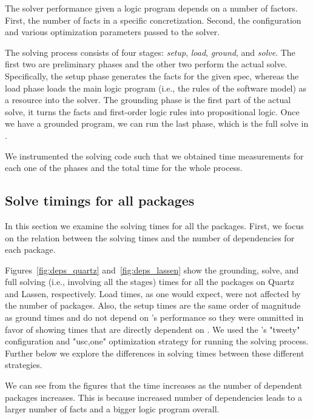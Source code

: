 
The \clingo{} solver performance given a logic program depends
on a number of factors. First, the number of facts in a specific concretization. Second,
the configuration and various optimization parameters passed to the solver. 

The solving process consists of four stages: \emph{setup}, \emph{load}, 
\emph{ground}, and \emph{solve}. The first two are preliminary phases and the other two 
perform the actual solve. Specifically, the setup phase generates the facts for the given
spec, whereas the load phase loads the main logic program (i.e., the rules of the software 
model) as a resource into the solver. The grounding phase is the first part of the actual
solve, it turns the facts and first-order logic rules into propositional logic. Once we
have a grounded program, we can run the last phase, which is the full solve in \clingo{}.

We instrumented the solving code such that we obtained time measurements for each one
of the phases and the total time for the whole process.


\subsection{Solve timings for all packages}

In this section we examine the solving times for all the packages. First, we focus on
the relation between the solving times and the number of dependencies for each package.





Figures~\ref{fig:deps_quartz} and~\ref{fig:deps_lassen} show the grounding, solve, and full solving (i.e., involving all the stages) times for all the packages on Quartz and Lassen, respectively. Load times, as one would expect, were not affected by the number of packages. Also, the setup times are the same order of magnitude as ground times and do not depend on \clingo{}'s performance so they were ommitted in favor of showing times that are directly dependent on \clingo{}. We used the \clingo{}'s "tweety" configuration and "usc,one" optimization strategy for running the solving process. Further below we explore the differences in solving times between these different strategies.

We can see from the figures that the time increases as the number of dependent packages increases. This is because increased number of dependencies leads to a larger number of facts and a bigger logic program overall.

